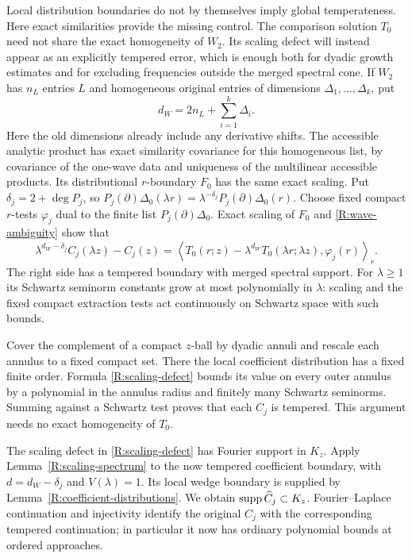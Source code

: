 Local distribution boundaries do not by themselves imply global
temperateness.  Here exact similarities provide the missing control.
The comparison solution $T_0$ need not share the exact homogeneity
of $W_2$.  Its scaling defect will instead appear as an explicitly
tempered error, which is enough both for dyadic growth estimates and
for excluding frequencies outside the merged spectral cone.
If $W_2$ has $n_L$ entries $L$ and homogeneous original entries of
dimensions $\Delta_1,\ldots,\Delta_k$, put
\[
 d_W=2n_L+\sum_{i=1}^k\Delta_i.
\]
Here the old dimensions already include any derivative shifts.
The accessible analytic product has exact similarity covariance for
this homogeneous list, by covariance of the one-wave data and uniqueness
of the multilinear accessible products.  Its distributional
$r$-boundary $F_0$ has the same exact scaling.  Put
$\delta_j=2+\deg P_j$, so
$P_j(\partial)\Delta_0(\lambda r)=\lambda^{-\delta_j}
P_j(\partial)\Delta_0(r)$.
Choose fixed compact $r$-tests $\varphi_j$ dual to the finite list
$P_j(\partial)\Delta_0$.  Exact scaling of $F_0$ and
\eqref{R:wave-ambiguity} show that
\begin{equation}\label{R:scaling-defect}
 \lambda^{d_W-\delta_j}C_j(\lambda z)-C_j(z)
 =\left\langle
      T_0(r;z)-\lambda^{d_W}T_0(\lambda r;\lambda z),
                   \varphi_j(r)\right\rangle_r.
\end{equation}
The right side has a tempered boundary with merged spectral support.
For $\lambda\geq1$ its Schwartz seminorm constants grow at most
polynomially in $\lambda$: scaling and the fixed compact extraction
tests act continuously on Schwartz space with such bounds.

Cover the complement of a compact $z$-ball by dyadic annuli and
rescale each annulus to a fixed compact set.  There the local
coefficient distribution has a fixed finite order.  Formula
\eqref{R:scaling-defect} bounds its value on every outer annulus by
a polynomial in the annulus radius and finitely many Schwartz
seminorms.  Summing against a Schwartz test proves that each $C_j$
is tempered.  This argument needs no exact homogeneity of $T_0$.

The scaling defect in \eqref{R:scaling-defect} has Fourier support
in $K_z$.  Apply Lemma~\ref{R:scaling-spectrum} to the now tempered
coefficient boundary, with $d=d_W-\delta_j$ and $V(\lambda)=1$.
Its local wedge boundary is supplied by
Lemma~\ref{R:coefficient-distributions}.  We obtain
$\operatorname{supp}\widehat C_j\subset K_z$.
Fourier--Laplace continuation and injectivity identify the original
$C_j$ with the corresponding tempered continuation; in particular
it now has ordinary polynomial bounds at ordered approaches.

